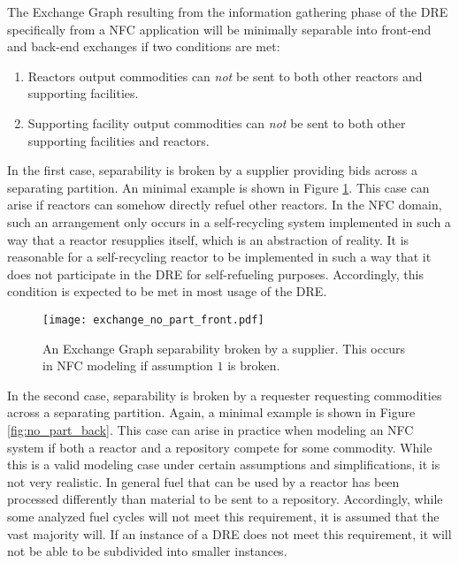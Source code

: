 The Exchange Graph resulting from the information gathering phase of the DRE
specifically from a NFC application will be minimally separable into front-end
and back-end exchanges if two conditions are met:

\begin{enumerate}
  \item Reactors output commodities can \textit{not} be sent to both other
    reactors and supporting facilities.

  \item Supporting facility output commodities can \textit{not} be sent to both
    other supporting facilities and reactors.
\end{enumerate}

In the first case, separability is broken by a supplier providing bids across a
separating partition. An minimal example is shown in Figure
\ref{fig:no_part_front}. This case can arise if reactors can somehow directly
refuel other reactors. In the NFC domain, such an arrangement only occurs in a
self-recycling system implemented in such a way that a reactor resupplies
itself, which is an abstraction of reality. It is reasonable for a
self-recycling reactor to be implemented in such a way that it does not
participate in the DRE for self-refueling purposes. Accordingly, this condition
is expected to be met in most usage of the DRE.

\begin{figure}
  \begin{center}
    \texttt{[image: exchange\_no\_part\_front.pdf]}
    \caption[]{
      \label{fig:no_part_front}
      An Exchange Graph separability broken by a supplier. This occurs in NFC
      modeling if assumption $1$ is broken.}
  \end{center}
\end{figure}

In the second case, separability is broken by a requester requesting commodities
across a separating partition. Again, a minimal example is shown in Figure
\ref{fig:no_part_back}. This case can arise in practice when modeling an NFC
system if both a reactor and a repository compete for some commodity. While this
is a valid modeling case under certain assumptions and simplifications, it is
not very realistic. In general fuel that can be used by a reactor has been
processed differently than material to be sent to a repository. Accordingly,
while some analyzed fuel cycles will not meet this requirement, it is assumed
that the vast majority will. If an instance of a DRE does not meet this
requirement, it will not be able to be subdivided into smaller instances.

